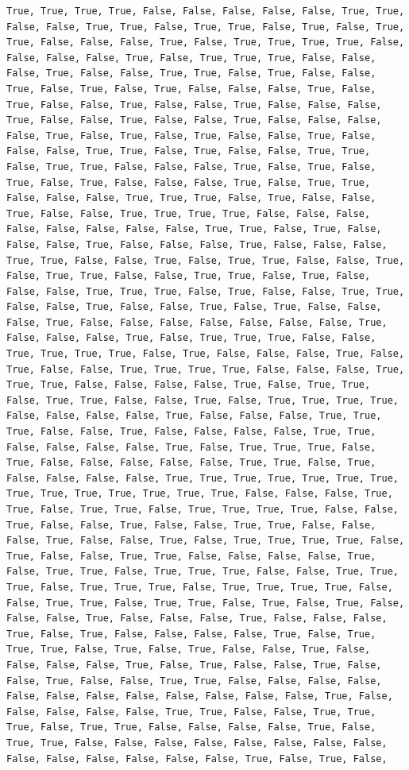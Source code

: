 \documentclass[
  letterpaper,
  DIV=11,
  numbers=noendperiod]{scrartcl}
\begin{document}
\begin{verbatim}
True, True, True, True, False, False, False, False, False, True, True, False, False, True, True, False, True, True, False, True, False, True, True, False, False, False, True, False, True, True, True, True, False, False, False, False, True, False, True, True, True, False, False, False, True, False, False, True, True, False, True, False, False, True, False, True, False, True, False, False, False, True, False, True, False, False, True, False, False, True, False, False, False, True, False, False, True, False, False, True, False, False, False, False, True, False, True, False, True, False, False, True, False, False, False, True, True, False, True, False, False, True, True, False, True, True, False, False, False, True, False, True, False, True, False, True, False, False, False, True, False, True, True, False, False, False, True, True, True, False, True, False, False, True, False, False, True, True, True, True, False, False, False, False, False, False, False, False, True, True, False, True, False, False, False, True, False, False, False, True, False, False, False, True, True, False, False, True, False, True, True, False, False, True, False, True, True, False, False, True, True, False, True, False, False, False, True, True, True, False, True, False, False, True, True, False, False, True, False, False, True, False, True, False, False, False, True, False, False, False, False, False, False, False, True, False, False, False, True, False, True, True, True, False, False, True, True, True, True, False, True, False, False, False, True, False, True, False, False, True, True, True, True, False, False, False, True, True, True, False, False, False, False, True, False, True, True, False, True, True, False, False, True, False, True, True, True, True, False, False, False, False, True, False, False, False, True, True, True, False, False, True, False, False, False, False, True, True, False, False, False, False, True, False, True, True, True, False, True, False, False, False, False, False, True, True, False, True, False, False, False, False, True, True, True, True, True, True, True, True, True, True, True, True, True, True, False, False, False, True, True, False, True, True, False, True, True, True, True, False, False, True, False, False, True, False, False, True, True, False, False, False, True, False, False, True, False, True, True, True, True, False, True, False, False, True, True, False, False, False, False, True, False, True, True, False, True, True, True, False, False, True, True, True, False, True, True, True, False, True, True, True, True, False, False, True, True, False, True, True, False, True, False, True, False, False, False, True, False, False, False, True, False, False, False, True, False, True, False, False, False, False, True, False, True, True, True, False, True, False, True, False, False, True, False, False, False, False, True, False, True, False, False, True, False, False, True, False, False, True, True, False, False, False, False, False, False, False, False, False, False, False, False, True, False, False, False, False, False, True, True, False, False, True, True, True, False, True, True, False, False, False, False, True, False, True, True, False, False, False, False, False, False, False, False, False, False, False, False, False, False, True, False, True, False, 
\end{verbatim}
\end{document}
